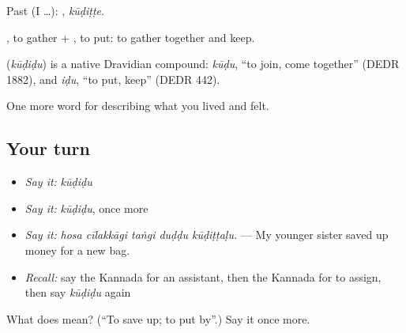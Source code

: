 Past (I …): , \emph{kūḍiṭṭe}.

, to gather + , to put: to gather together and keep.

\begin{cousinweb}
\textbf{} (\emph{kūḍiḍu}) is a native Dravidian compound: \emph{kūḍu}, \textquotedblleft{}to join, come together\textquotedblright{} (DEDR 1882), and \emph{iḍu}, \textquotedblleft{}to put, keep\textquotedblright{} (DEDR 442).
\end{cousinweb}

\begin{grammarlens}[title={What you've built}]
One more word for describing what you lived and felt.
\end{grammarlens}

\subsection*{Your turn}
\begin{itemize}
\raggedright
  \item \emph{Say it:} \emph{kūḍiḍu}
  \item \emph{Say it:} \emph{kūḍiḍu}, once more
  \item \emph{Say it:} \emph{hosa cīlakkāgi taṅgi duḍḍu kūḍiṭṭaḷu.} — My younger sister saved up money for a new bag.
  \item \emph{Recall:} say the Kannada for an assistant, then the Kannada for to assign, then say \emph{kūḍiḍu} again
\end{itemize}

\begin{tcolorbox}[breakable,colback=teal!4,colframe=teal!35!black,title={Before you move on}]
What does  mean? (\textquotedblleft{}To save up; to put by\textquotedblright{}.) Say it once more.
\end{tcolorbox}
